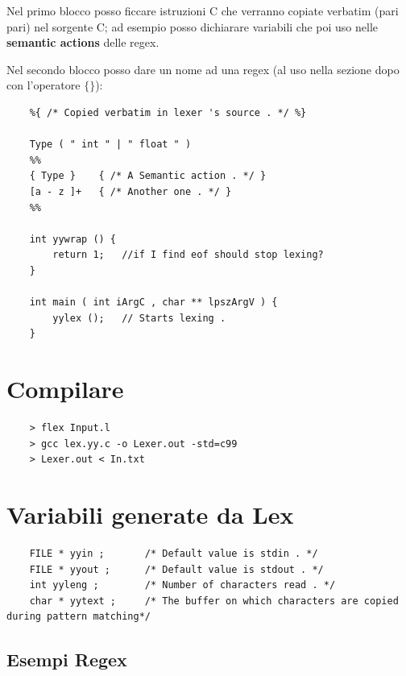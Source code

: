Nel primo blocco posso ficcare istruzioni C che verranno copiate verbatim (pari pari) nel sorgente C; ad esempio posso dichiarare 
variabili che poi uso nelle \textbf{semantic actions} delle regex.

Nel secondo blocco posso dare un nome ad una regex (al uso nella sezione 
dopo con l'operatore $\{ \}$):

\begin{lstlisting}
	%{ /* Copied verbatim in lexer 's source . */ %}

	Type ( " int " | " float " )
	%%
	{ Type } 	{ /* A Semantic action . */ }
	[a - z ]+ 	{ /* Another one . */ }
	%%

	int yywrap () { 
		return 1;	//if I find eof should stop lexing?
	}

	int main ( int iArgC , char ** lpszArgV ) {
		yylex (); 	// Starts lexing .
	}
\end{lstlisting}

\section{Compilare}

\begin{lstlisting}
	> flex Input.l
	> gcc lex.yy.c -o Lexer.out -std=c99
	> Lexer.out < In.txt
\end{lstlisting}

\section{Variabili generate da Lex}
\begin{lstlisting}
	FILE * yyin ;		/* Default value is stdin . */
	FILE * yyout ;		/* Default value is stdout . */
	int yyleng ;		/* Number of characters read . */
	char * yytext ;		/* The buffer on which characters are copied during pattern matching*/
\end{lstlisting}

\subsection{Esempi Regex}

